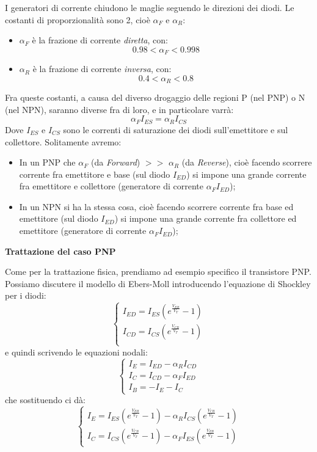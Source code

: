 \documentclass[a4paper,11pt]{article}
\begin{document}
I generatori di corrente chiudono le maglie seguendo le direzioni dei diodi. Le costanti di proporzionalità sono 2, cioè $\alpha_F$ e $\alpha_R$:
\begin{itemize}
	\item $\alpha_F$ è la frazione di corrente \textit{diretta}, con:
$$
0.98 < \alpha_F < 0.998
$$
	\item $\alpha_R$ è la frazione di corrente \textit{inversa}, con:
$$
0.4 < \alpha_R < 0.8
$$
\end{itemize}
Fra queste costanti, a causa del diverso drogaggio delle regioni P (nel PNP) o N (nel NPN), saranno diverse fra di loro, e in particolare varrà:
$$
\alpha_F I_{ES} = \alpha_R I_{CS}
$$
Dove $I_{ES}$ e $I_{CS}$ sono le correnti di saturazione dei diodi sull'emettitore e sul collettore. Solitamente avremo:
\begin{itemize}
	\item In un PNP che $\alpha_F$ (da \textit{Forward}) $>>$ $\alpha_R$ (da \textit{Reverse}), cioè facendo scorrere corrente fra emettitore e base (sul diodo $I_{ED}$) si impone una grande corrente fra emettitore e collettore (generatore di corrente $\alpha_F I_{ED}$);
	\item In un NPN si ha la stessa cosa, cioè facendo scorrere corrente fra base ed emettitore (sul diodo $I_{ED}$) si impone una grande corrente fra collettore ed emettitore (generatore di corrente $\alpha_F I_{ED}$);
\end{itemize}

\par\smallskip

\noindent
\textbf{\textsf{Trattazione del caso PNP}}

\noindent
Come per la trattazione fisica, prendiamo ad esempio specifico il transistore PNP.
Possiamo discutere il modello di Ebers-Moll introducendo l'equazione di Shockley per i diodi:
$$
\begin{cases}
	I_{ED} = I_{ES} \left( e^\frac{V_{EB}}{V_T} - 1 \right) \\
	I_{CD} = I_{CS} \left( e^\frac{V_{CB}}{V_T} - 1 \right) \\
\end{cases}
$$
e quindi scrivendo le equazioni nodali:
$$
\begin{cases}
I_E = I_{ED} - \alpha_R I_{CD} \\
I_C = I_{CD} - \alpha_F I_{ED} \\
I_B = -I_E - I_C
\end{cases}
$$
che sostituendo ci dà:
$$
\begin{cases}
I_E = I_{ES} \left( e^\frac{V_{EB}}{V_T} - 1 \right) - \alpha_R I_{CS} \left( e^\frac{V_{CB}}{V_T} - 1 \right) \\
I_C = I_{CS} \left( e^\frac{V_{CB}}{V_T} - 1 \right) - \alpha_F I_{ES} \left( e^\frac{V_{EB}}{V_T} - 1 \right)
\end{cases}
$$
\end{document}
